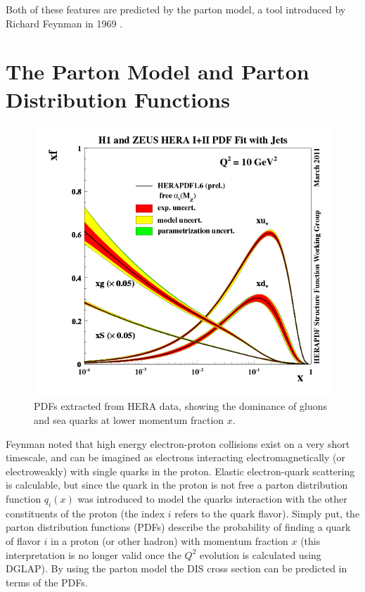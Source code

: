 Both of these features are predicted by the parton model, a tool introduced by Richard Feynman in 1969 \cite{history-feynman:1969}.

\section{The Parton Model and Parton Distribution Functions}

\begin{figure}
	\centering
	\includegraphics[width = \textwidth]{image/plots/introduction/pdf.png}	
	\caption[A recent PDF extraction from HERA data.]{PDFs extracted from HERA data, showing the dominance of gluons and sea quarks at lower momentum fraction $x$.}
	\label{fig:pdfs}
\end{figure}

Feynman noted that high energy electron-proton collisions exist on a very short timescale, and can be imagined as electrons interacting electromagnetically (or electroweakly) with single quarks in the proton.  Elastic electron-quark scattering is calculable, but since the quark in the proton is not free a parton distribution function $q_i(x)$ was introduced to model the quarks interaction with the other constituents of the proton (the index $i$ refers to the quark flavor).  Simply put, the parton distribution functions (PDFs) describe the probability of finding a quark of flavor $i$ in a proton (or other hadron) with momentum fraction $x$ (this interpretation is no longer valid once the $Q^2$ evolution is calculated using DGLAP).  By using the parton model the DIS cross section can be predicted in terms of the PDFs.    

